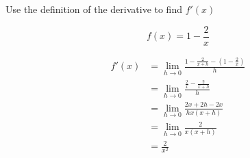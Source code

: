 \documentclass[letterpaper]{exam}
\begin{document}
\begin{questions}
\begin{solution}
      \end{solution}



      \question[10] Use the definition of the derivative to find $f'(x)$

      \label{derivative:last}
      \[
        f(x) = 1 - \frac{2}{x}
      \]

      \begin{solution}
        \begin{align*}
          f'(x) & = \lim_{h \to 0} \frac{1 - \frac{2}{x + h} - \left( 1 - \frac{2}{x} \right)}{h} \\
                &= \lim_{h \to 0} \frac{\frac{2}{x} - \frac{2}{x+h}}{h} \\
                &= \lim_{h \to 0} \frac{2x + 2h - 2x}{hx(x + h)} \\
                &= \lim_{h \to 0} \frac{2}{x(x + h)} \\
                &= \boxed{ \frac{2}{x^2} } \\
        \end{align*}
      \end{solution}
      

\end{questions}
\end{document}
